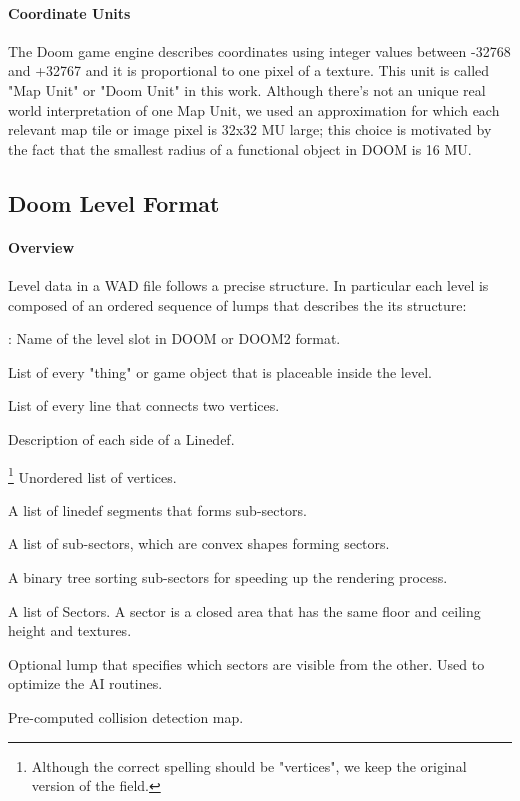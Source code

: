 \paragraph{Coordinate Units} The Doom game engine describes coordinates using integer values between -32768 and +32767 and it is proportional to one pixel of a texture. This unit is called "Map Unit" or "Doom Unit" in this work. Although there's not an unique real world interpretation of one Map Unit, we used an approximation for which each relevant map tile or image pixel is 32x32 MU large; this choice is motivated by the fact that the smallest radius of a functional object in DOOM is 16 MU. 

\subsection{Doom Level Format}
\paragraph{Overview} Level data in a \gls{WAD} file follows a precise structure. In particular each level is composed of an ordered sequence of lumps that describes the its structure:
	\begin{description}[wide=\parindent]
		\item[(NAME)]: Name of the level slot in DOOM or DOOM2 format.
		\item[THINGS] List of every "\gls{thing}" or game object that is placeable inside the level.
		\item[LINEDEFS] List of every line that connects two vertices.
		\item[SIDEDEFS] Description of each side of a Linedef.
		\item[VERTEXES]\footnote{Although the correct spelling should be "vertices", we keep the original version of the field.} Unordered list of vertices.
		\item[SEGS] A list of linedef segments that forms sub-sectors.
		\item[SSECTORS] A list of sub-sectors, which are convex shapes forming sectors.
		\item[NODES] A binary tree sorting sub-sectors for speeding up the rendering process.
		\item[SECTORS] A list of Sectors. A \gls{sector} is a closed area that has the same floor and ceiling height and textures.
		\item[REJECT] Optional lump that specifies which sectors are visible from the other. Used to optimize the AI routines.
		\item[BLOCKMAP] Pre-computed collision detection map. 
	\end{description}

